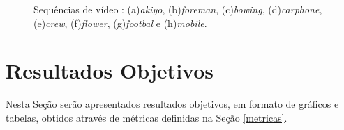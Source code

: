 \begin{figure}[H]
{    }
	\qquad
	\qquad
    \qquad

    \caption{Sequências de vídeo : (a)\textit{akiyo}, (b)\textit{foreman}, (c)\textit{bowing}, (d)\textit{carphone}, (e)\textit{crew}, (f)\textit{flower}, (g)\textit{footbal} e  (h)\textit{mobile}.}
	    
    \label{fig:seg}
\end{figure}


\section{Resultados Objetivos}
Nesta Seção serão apresentados resultados objetivos, em formato de gráficos e tabelas, obtidos através de métricas definidas na Seção \ref{metricas}.


